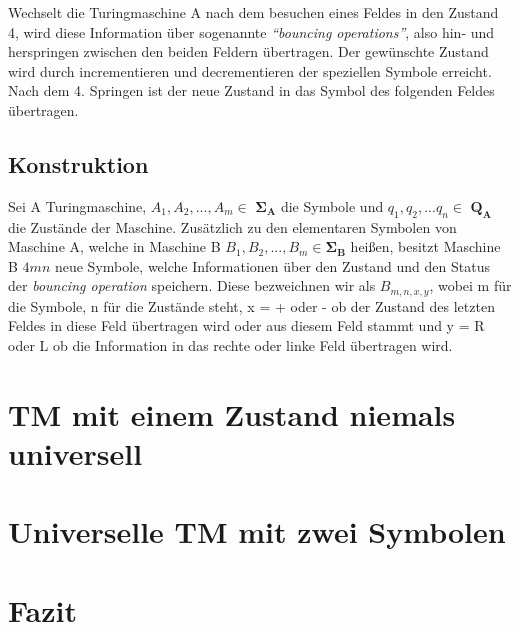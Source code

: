 \documentclass[12pt, a4paper]{article}
\begin{document}
Wechselt die Turingmaschine A nach dem besuchen eines Feldes in den Zustand 4, wird diese Information über sogenannte \textit{\enquote{bouncing operations}}, also hin- und herspringen zwischen den beiden Feldern übertragen. Der gewünschte Zustand wird durch incrementieren und decrementieren der speziellen Symbole erreicht. Nach dem 4. Springen ist der neue Zustand in das Symbol des folgenden Feldes übertragen.

\subsection{Konstruktion}

Sei A Turingmaschine, $ A_1,A_2,...,A_m \in$ $\mathbf{\Sigma_A}$ die Symbole und $q_1,q_2,...q_n \in$ $\mathbf{Q_A}$ die Zustände der Maschine. Zusätzlich zu den elementaren Symbolen von Maschine A, welche in Maschine B $B_1,B_2,...,B_m \in \mathbf{\Sigma_B}$ heißen, besitzt Maschine B $4mn$ neue Symbole, welche Informationen über den Zustand und den Status der \textit{bouncing operation} speichern.
Diese bezweichnen wir als $B_{m,n,x,y}$, wobei m für die Symbole, n für die Zustände steht, x = + oder - ob der Zustand des letzten Feldes in diese Feld übertragen wird oder aus diesem Feld stammt und y = R oder L ob die Information in das rechte oder linke Feld übertragen wird.  

\section{TM mit einem Zustand niemals universell}

\section{Universelle TM mit zwei Symbolen}

\section{Fazit}
\end{document}
